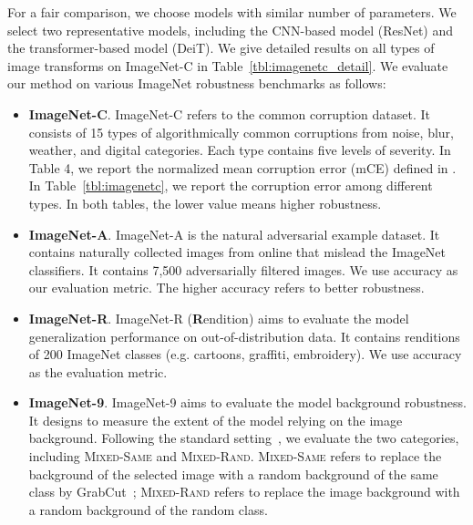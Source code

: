 For a fair comparison, we choose models with similar number of parameters. We select two representative models, including the  CNN-based model (ResNet) and the transformer-based model (DeiT).  
We give detailed results on all types of image transforms on ImageNet-C in Table~\ref{tbl:imagenetc_detail}.  We evaluate our method on various  ImageNet robustness benchmarks as follows:

\vspace{-0.5em}
\begin{itemize}[leftmargin=1.5em]

    \item \textbf{ImageNet-C}. ImageNet-C refers to the common corruption dataset. It consists of 15 types of algorithmically common corruptions from noise, blur, weather, and digital categories. Each type contains five levels of severity. In Table 4, we report the normalized mean corruption error (mCE) defined in \citet{hendrycks2018imagenetc}.  In Table~\ref{tbl:imagenetc}, we report the corruption error among different types. In both tables, the lower value means higher robustness. 
        \item \textbf{ImageNet-A}. ImageNet-A is the natural adversarial example dataset. It contains naturally collected images from online that mislead the ImageNet classifiers. It contains 7,500 adversarially filtered images. We use accuracy as our evaluation metric. The higher accuracy refers to better robustness.        
        
    \item \textbf{ImageNet-R}. ImageNet-R (\textbf{R}endition) aims to evaluate the model generalization performance on out-of-distribution data.  It contains renditions of 200 ImageNet classes (e.g. cartoons, graffiti, embroidery). We use accuracy as the evaluation metric. 
    \item \textbf{ImageNet-9}. ImageNet-9 aims to evaluate the model background robustness. It designs to measure the extent of the model relying on the image background. Following the standard setting~\cite{xiao2020noise}, we evaluate the two categories, including \textsc{Mixed-Same} and \textsc{Mixed-Rand}. \textsc{Mixed-Same} refers to replace the background of the selected image with a random background of the same class by GrabCut~\cite{xiao2020noise}; \textsc{Mixed-Rand} refers to replace the image background with a random background of the random class.
\end{itemize}
\vspace{-0.5em}


